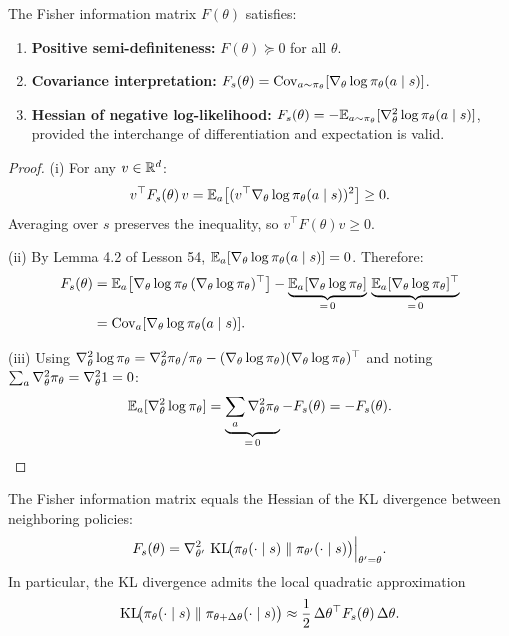 \documentclass[11pt,a4paper]{article}
\begin{document}
\begin{proposition}
\label{prop:fisher-properties}
The Fisher information matrix $F(\theta)$ satisfies:
\begin{enumerate}[label=(\roman*)]
  \item \textbf{Positive semi-definiteness:} $F(\theta) \succeq 0$ for
    all $\theta$.
  \item \textbf{Covariance interpretation:} $F_s(\theta) =
    \operatorname{Cov}_{a \sim \pi_\theta}[\nabla_\theta \log \pi_\theta(a \mid s)]$.
  \item \textbf{Hessian of negative log-likelihood:}
    $F_s(\theta) = -\mathbb{E}_{a \sim \pi_\theta}[\nabla_\theta^2 \log
    \pi_\theta(a \mid s)]$, provided the interchange of
    differentiation and expectation is valid.
\end{enumerate}
\end{proposition}

\begin{proof}
(i) For any $v \in \mathbb{R}^d$:
\[
  v^\top F_s(\theta)\, v
  = \mathbb{E}_a\!\left[(v^\top \nabla_\theta \log \pi_\theta(a \mid s))^2\right]
  \geq 0.
\]
Averaging over $s$ preserves the inequality, so $v^\top F(\theta) v \geq 0$.

(ii) By Lemma 4.2 of Lesson 54, $\mathbb{E}_a[\nabla_\theta \log
\pi_\theta(a \mid s)] = 0$. Therefore:
\begin{align*}
  F_s(\theta) &= \mathbb{E}_a\!\left[\nabla_\theta \log \pi_\theta\,
    (\nabla_\theta \log \pi_\theta)^\top\right]
  - \underbrace{\mathbb{E}_a[\nabla_\theta \log \pi_\theta]}_{=\,0}\,
    \underbrace{\mathbb{E}_a[\nabla_\theta \log \pi_\theta]^\top}_{=\,0} \\
  &= \operatorname{Cov}_a[\nabla_\theta \log \pi_\theta(a \mid s)].
\end{align*}

(iii) Using $\nabla_\theta^2 \log \pi_\theta = \nabla_\theta^2
\pi_\theta / \pi_\theta - (\nabla_\theta \log \pi_\theta)
(\nabla_\theta \log \pi_\theta)^\top$ and noting
$\sum_a \nabla_\theta^2 \pi_\theta = \nabla_\theta^2 1 = 0$:
\[
  \mathbb{E}_a[\nabla_\theta^2 \log \pi_\theta]
  = \underbrace{\sum_a \nabla_\theta^2 \pi_\theta}_{=\,0}
    - F_s(\theta)
  = -F_s(\theta). \qedhere
\]
\end{proof}

\begin{theorem}
\label{thm:fisher-kl}
The Fisher information matrix equals the Hessian of the KL divergence
between neighboring policies:
\[
  F_s(\theta) = \nabla_{\theta'}^2\,
  \operatorname{KL}\!\bigl(\pi_\theta(\cdot \mid s) \;\|\;
  \pi_{\theta'}(\cdot \mid s)\bigr)\Big|_{\theta' = \theta}.
\]
In particular, the KL divergence admits the local quadratic approximation
\[
  \operatorname{KL}\!\bigl(\pi_\theta(\cdot \mid s) \;\|\;
  \pi_{\theta + \Delta\theta}(\cdot \mid s)\bigr)
  \approx \frac{1}{2}\, \Delta\theta^\top F_s(\theta)\, \Delta\theta.
\]
\end{theorem}
\end{document}
